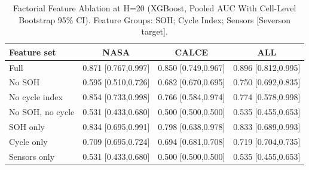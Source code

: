 \documentclass[preprint,12pt]{elsarticle}
\begin{document}
\begin{table}
\centering
\caption{Factorial Feature Ablation at H=20 (XGBoost, Pooled AUC With Cell-Level Bootstrap 95\% CI). Feature Groups: SOH; Cycle Index; Sensors [Severson target].}
\label{tab:abl-severson}
\begin{tabular}{lccc}
\toprule
\textbf{Feature set} & \textbf{NASA} & \textbf{CALCE} & \textbf{ALL} \\
\midrule
Full & 0.871 [0.767,0.997] & 0.850 [0.749,0.967] & 0.896 [0.812,0.995] \\
No SOH & 0.595 [0.510,0.726] & 0.682 [0.670,0.695] & 0.750 [0.692,0.835] \\
No cycle index & 0.854 [0.733,0.998] & 0.766 [0.584,0.974] & 0.774 [0.578,0.998] \\
No SOH, no cycle & 0.531 [0.433,0.680] & 0.500 [0.500,0.500] & 0.535 [0.455,0.653] \\
SOH only & 0.834 [0.695,0.991] & 0.798 [0.638,0.978] & 0.833 [0.689,0.993] \\
Cycle only & 0.709 [0.695,0.724] & 0.694 [0.681,0.708] & 0.719 [0.704,0.735] \\
Sensors only & 0.531 [0.433,0.680] & 0.500 [0.500,0.500] & 0.535 [0.455,0.653] \\
\bottomrule
\end{tabular}
\end{table}

\begin{table}[!t]
\caption{Same-Chemistry Cross-Laboratory Controls at H=20 (XGBoost, Pooled AUC [CI]). Full Feature Sets Exercise the Zero-Imputation Confound; Common Sets Restrict Both Datasets to the Shared Four-Feature Subset.}
\label{tab:samechem}
\centering
{}
\end{table}
\end{document}
